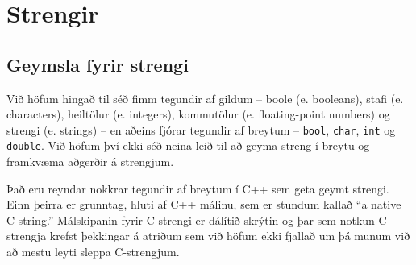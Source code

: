 





\chapter{Strengir}
\label{strings}

\section{Geymsla fyrir strengi}

Við höfum hingað til séð fimm tegundir af gildum -- boole (e. booleans), stafi (e. characters), heiltölur (e. integers),
kommutölur (e. floating-point numbers) og strengi (e. strings) -- en aðeins fjórar tegundir af breytum -- {\tt bool}, {\tt char}, {\tt int} og {\tt double}.
Við höfum því ekki séð neina leið til að geyma streng í breytu og framkvæma aðgerðir á strengjum.

Það eru reyndar nokkrar tegundir af breytum í C++ sem geta geymt strengi.
Einn þeirra er grunntag, hluti af C++ málinu, sem er stundum kallað ``a native C-string.''
Málskipanin fyrir C-strengi er dálítið skrýtin og þar sem notkun C-strengja krefst þekkingar á atriðum sem við höfum ekki fjallað um þá munum við að mestu leyti sleppa C-strengjum.

